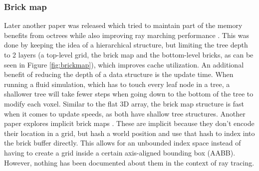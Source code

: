 \begin{figure}[H]
    \centering
    \hfill
\end{figure}

\subsubsection{Brick map} \label{related_work:voxel_data_structures:brickmap}
Later another paper was released which tried to maintain part of the memory benefits from octrees while also improving ray marching performance \cite{van2015real}. This was done by keeping the idea of a hierarchical structure, but limiting the tree depth to 2 layers (a top-level grid, the brick map and the bottom-level bricks, as can be seen in Figure \ref{fig:brickmap}), which improves cache utilization. An additional benefit of reducing the depth of a data structure is the update time. When running a fluid simulation, which has to touch every leaf node in a tree, a shallower tree will take fewer steps when going down to the bottom of the tree to modify each voxel. Similar to the flat 3D array, the brick map structure is fast when it comes to update speeds, as both have shallow tree structures. Another paper explores implicit brick maps \cite{niessner2013real}. These are implicit because they don't encode their location in a grid, but hash a world position and use that hash to index into the brick buffer directly. This allows for an unbounded index space instead of having to create a grid inside a certain axis-aligned bounding box (AABB). However, nothing has been documented about them in the context of ray tracing.


